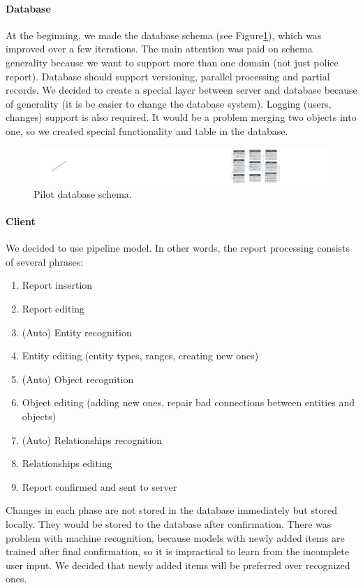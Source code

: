 \paragraph{Database}
At the beginning, we made the database schema (see Figure\ref{fig:dbpilot}),
which was improved over a few iterations. The main attention was paid on schema
generality because we want to support more than one domain (not just police
report). Database should support versioning, parallel processing and partial
records. We decided to create a special layer between server and database
because of generality (it is be easier to change the database system). Logging
(users, changes) support is also required. It would be a problem merging two
objects into  one, so we created special functionality and table in the
database.

\begin{figure}[!htb]
        \centering
        \includegraphics[width=\textwidth]{Images/db-pilot}
        \caption{Pilot database schema.}
        \label{fig:dbpilot}
\end{figure}

\paragraph{Client}
We decided to use pipeline model. In other words, the report processing consists
of several phrases:

\begin{enumerate}
\item Report insertion
\item Report editing
\item (Auto) Entity recognition
\item Entity editing (entity types, ranges, creating new ones)
\item (Auto) Object recognition
\item Object editing (adding new ones, repair bad connections between entities and objects)
\item (Auto) Relationships recognition
\item Relationships editing
\item Report confirmed and sent to server
\end{enumerate}

Changes in each phase are not stored in the database immediately but stored
locally. They would be stored to the database after confirmation. There was
problem with machine recognition, because models with newly added items are
trained after final confirmation, so it is impractical to learn from the
incomplete user input. We decided that newly added items will be preferred over
recognized ones. 
 
